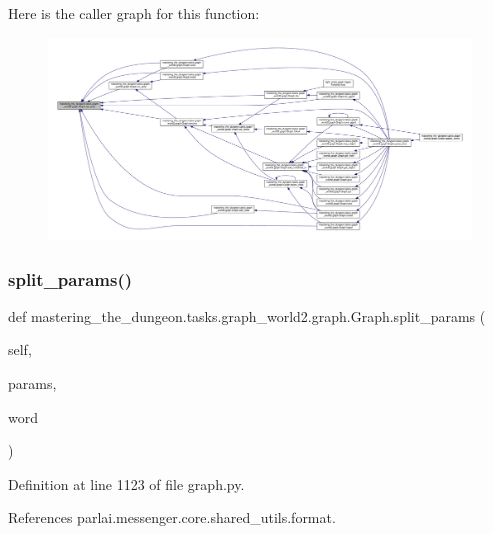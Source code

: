 Here is the caller graph for this function\+:
\nopagebreak
\begin{figure}[H]
\begin{center}
\leavevmode
\includegraphics[width=350pt]{classmastering__the__dungeon_1_1tasks_1_1graph__world2_1_1graph_1_1Graph_ace895c0ddc2b66808fa28f6a383574f1_icgraph}
\end{center}
\end{figure}
\mbox{\label{classmastering__the__dungeon_1_1tasks_1_1graph__world2_1_1graph_1_1Graph_ad6154c88ce3c912fbe9dce0cd8e96d13}} 
\subsubsection{\texorpdfstring{split\+\_\+params()}{split\_params()}}
{\footnotesize\ttfamily def mastering\+\_\+the\+\_\+dungeon.\+tasks.\+graph\+\_\+world2.\+graph.\+Graph.\+split\+\_\+params (\begin{DoxyParamCaption}\item[{}]{self,  }\item[{}]{params,  }\item[{}]{word }\end{DoxyParamCaption})}



Definition at line 1123 of file graph.\+py.



References parlai.\+messenger.\+core.\+shared\+\_\+utils.\+format.



